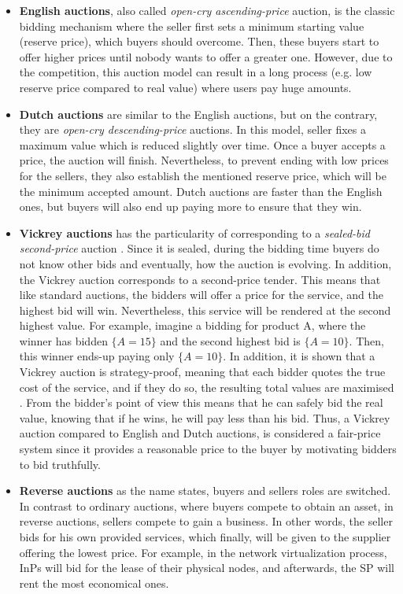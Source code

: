 \begin{itemize}
	\item \textbf{English auctions}, also called \textit{open-cry ascending-price} auction, is the classic bidding mechanism where the seller first sets a minimum starting value (reserve price), which buyers should overcome. Then, these buyers start to offer higher prices until nobody wants to offer a greater one. However, due to the competition, this auction model can result in a long process (e.g. low reserve price compared to real value) where users pay huge amounts.
	\item \textbf{Dutch auctions} are similar to the English auctions, but on the contrary, they are \textit{open-cry descending-price} auctions. In this model, seller fixes a maximum value which is reduced slightly over time. Once a buyer accepts a price, the auction will finish. Nevertheless, to prevent ending with low prices for the sellers, they also establish the mentioned reserve price, which will be the minimum accepted amount. Dutch auctions are faster than the English ones, but buyers will also end up paying more to ensure that they win.
	\item \textbf{Vickrey auctions} has the particularity of corresponding to a \textit{sealed-bid second-price} auction \cite{vickrey1961counterspeculation}. Since it is sealed, during the bidding time buyers do not know other bids and eventually, how the auction is evolving. In addition, the Vickrey auction corresponds to a second-price tender. This means that like standard auctions, the bidders will offer a price for the service, and the highest bid will win. Nevertheless, this service will be rendered at the second highest value. For example, imagine a bidding for product A, where the winner has bidden $\{A = 15\}$ and the second highest bid is $\{A = 10\}$. Then, this winner ends-up paying only $\{A = 10\}$. In addition, it is shown that a Vickrey auction is strategy-proof, meaning that each bidder quotes the true cost of the service, and if they do so, the resulting total values are maximised  \cite{vickrey1961counterspeculation}. From the bidder's point of view this means that he can safely bid the real value, knowing that if he wins, he will pay less than his bid. Thus, a Vickrey auction compared to English and Dutch auctions, is considered a fair-price system since it provides a reasonable price to the buyer by motivating bidders to bid truthfully.
	\item \textbf{Reverse auctions} as the name states, buyers and sellers roles are switched. In contrast to ordinary auctions, where buyers compete to obtain an asset, in reverse auctions, sellers compete to gain a business. In other words, the seller bids for his own provided services, which finally, will be given to the supplier offering the lowest price. For example, in the network virtualization process, InPs will bid for the lease of their physical nodes, and afterwards, the SP will rent the most economical ones.
\end{itemize}

